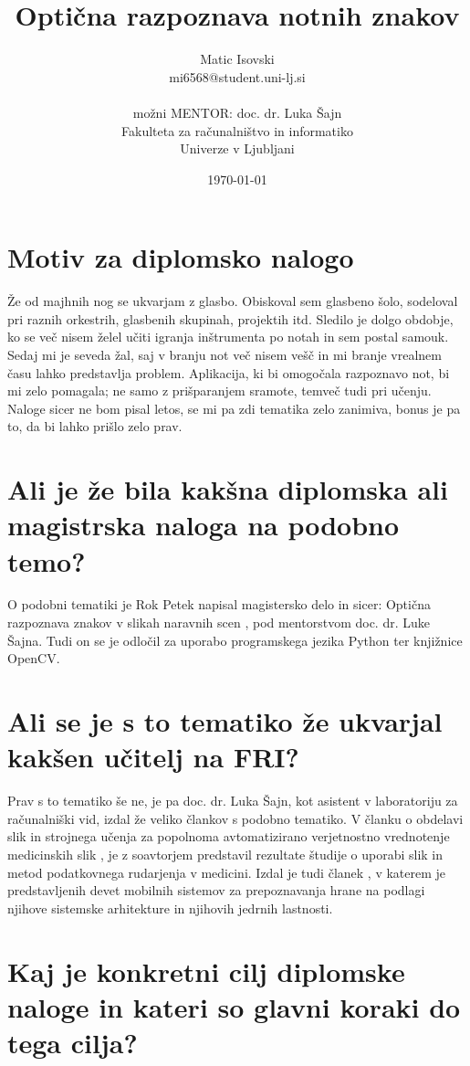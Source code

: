 \documentclass[11pt,a4paper]{article}
\title{Optična razpoznava notnih znakov}
\author{Matic Isovski\\
mi6568@student.uni-lj.si\\
\ \\
možni MENTOR: doc. dr. Luka Šajn \\
Fakulteta za računalništvo in informatiko\\
Univerze v Ljubljani
\date{\today}         
}
\begin{document}
\maketitle

\section{Motiv za diplomsko nalogo}

Že od majhnih nog se ukvarjam z glasbo. Obiskoval sem glasbeno šolo, sodeloval pri raznih orkestrih, glasbenih skupinah, projektih itd. Sledilo je dolgo obdobje, ko se več nisem želel učiti igranja inštrumenta po notah in sem postal samouk. Sedaj mi je seveda žal, saj v branju not več nisem vešč in mi branje vrealnem času lahko predstavlja problem. Aplikacija, ki bi omogočala razpoznavo not, bi mi zelo pomagala; ne samo z prišparanjem sramote, temveč tudi pri učenju. Naloge sicer ne bom pisal letos, se mi pa zdi tematika zelo zanimiva, bonus je pa to, da bi lahko prišlo zelo prav. 

\section{Ali je že bila kakšna diplomska ali magistrska naloga na podobno temo?}

O podobni tematiki je Rok Petek napisal magistersko delo in sicer: Optična razpoznava znakov v slikah naravnih scen \cite{diploma}, pod mentorstvom doc. dr. Luke Šajna. Tudi on se je odločil za uporabo programskega jezika Python ter knjižnice OpenCV.


\section{Ali se je s to tematiko že ukvarjal kakšen učitelj na FRI?}

Prav s to tematiko še ne, je pa doc. dr. Luka Šajn, kot asistent v laboratoriju za računalniški vid, izdal že veliko člankov s podobno tematiko.
V članku o obdelavi slik in strojnega učenja za popolnoma avtomatizirano verjetnostno vrednotenje medicinskih slik \cite{article1}, je z soavtorjem predstavil rezultate študije o uporabi slik in metod podatkovnega rudarjenja v medicini.
Izdal je tudi članek \cite{article2}, v katerem je predstavljenih devet mobilnih sistemov za prepoznavanja hrane na podlagi njihove sistemske arhitekture in njihovih jedrnih lastnosti.


\section{Kaj je konkretni cilj diplomske naloge in kateri so glavni koraki do tega cilja?}
\end{document}
